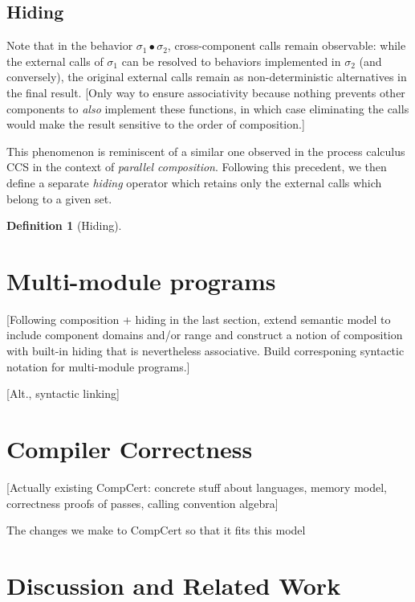 \documentclass{article}
\newtheorem{definition}{Definition}
\begin{document}

\subsection{Hiding} %

Note that
in the behavior $\sigma_1 \bullet \sigma_2$,
cross-component calls remain observable:
while the external calls of $\sigma_1$
can be resolved to behaviors implemented in $\sigma_2$
(and conversely),
the original external calls remain
as non-deterministic alternatives in the final result.
[Only way to ensure associativity
because nothing prevents other components
to \emph{also} implement these functions,
in which case eliminating the calls
would make the result sensitive to the order of composition.]

This phenomenon is reminiscent of a similar one observed
in the process calculus CCS \cite{ccs}
in the context of \emph{parallel composition}.
Following this precedent,
we then define a separate \emph{hiding} operator
which retains only the external calls
which belong to a given set.

\begin{definition}[Hiding]

\end{definition}



\section{Multi-module programs} %

[Following composition + hiding in the last section,
extend semantic model to include component domains and/or range
and construct a notion of composition with built-in hiding
that is nevertheless associative.
Build corresponing syntactic notation
for multi-module programs.]

[Alt., syntactic linking]


\section{Compiler Correctness} %

[Actually existing CompCert: concrete stuff about languages,
memory model, correctness proofs of passes, calling convention algebra]

The changes we make to CompCert so that it fits this model


\section{Discussion and Related Work} %

\end{document}
